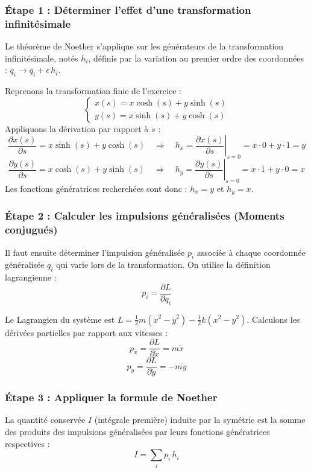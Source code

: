 \documentclass[french]{yLectureNote}
\begin{document}
\subsubsection{Étape 1 : Déterminer l'effet d'une transformation infinitésimale}
Le théorème de Noether s'applique sur les générateurs de la transformation infinitésimale, notés $h_i$, définis par la variation au premier ordre des coordonnées : $q_i \to q_i + \epsilon \, h_i$.



Reprenons la transformation finie de l'exercice :
$$ \begin{cases} x(s) = x \cosh(s) + y \sinh(s) \\ y(s) = x \sinh(s) + y \cosh(s) \end{cases} $$
Appliquons la dérivation par rapport à $s$ :
$$ \frac{\partial x(s)}{\partial s} = x \sinh(s) + y \cosh(s) \quad \Longrightarrow \quad h_x = \left. \frac{\partial x(s)}{\partial s} \right|_{s=0} = x \cdot 0 + y \cdot 1 = y $$
$$ \frac{\partial y(s)}{\partial s} = x \cosh(s) + y \sinh(s) \quad \Longrightarrow \quad h_y = \left. \frac{\partial y(s)}{\partial s} \right|_{s=0} = x \cdot 1 + y \cdot 0 = x $$
Les fonctions génératrices recherchées sont donc : $h_x = y$ et $h_y = x$.


\subsubsection*{Étape 2 : Calculer les impulsions généralisées (Moments conjugués)}
Il faut ensuite déterminer l'impulsion généralisée $p_i$ associée à chaque coordonnée généralisée $q_i$ qui varie lors de la transformation. On utilise la définition lagrangienne :
$$ p_i = \frac{\partial L}{\partial \dot{q}_i} $$


Le Lagrangien du système est $L = \frac{1}{2}m(\dot{x}^2 - \dot{y}^2) - \frac{1}{2}k(x^2 - y^2)$. Calculons les dérivées partielles par rapport aux vitesses :
$$ p_x = \frac{\partial L}{\partial \dot{x}} = m\dot{x} $$
$$ p_y = \frac{\partial L}{\partial \dot{y}} = -m\dot{y} $$


\subsubsection*{Étape 3 : Appliquer la formule de Noether}
\begin{theorem}
La quantité conservée $I$ (intégrale première) induite par la symétrie est la somme des produits des impulsions généralisées par leurs fonctions génératrices respectives :
$$ I = \sum_i p_i \, h_i $$
\end{theorem}
\end{document}
